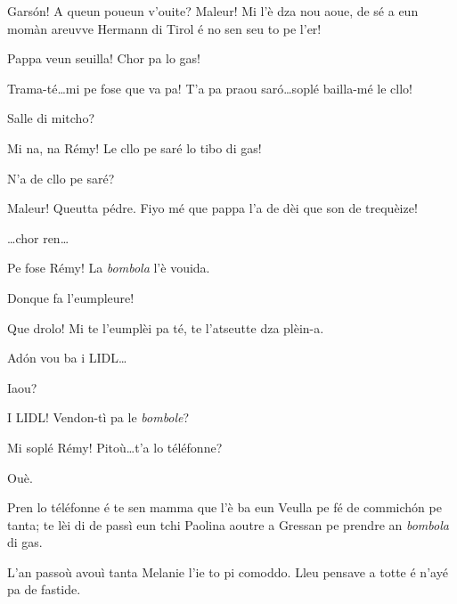 
\begin{drama}

\Cesarspeaks{} Gars\'on! A queun poueun v'ouite? Maleur! Mi l'è dza nou aoue, de sé a eun momàn areuvve Hermann di Tirol é no sen seu to pe l'er!

\Remyspeaks Pappa veun seuilla! Chor pa lo gas! 

\Cesarspeaks{} Trama-té\ldots mi pe fose que va pa! T'a pa praou sar\'o\ldots soplé bailla-mé le cllo!

\Remyspeaks Salle di mitcho?

\Cesarspeaks{} Mi na, na Rémy! Le cllo pe saré lo tibo di gas!

\Remyspeaks N'a de cllo pe saré?

\Cesarspeaks Maleur! Queutta pédre. Fiyo mé que pappa l'a de dèi que son de trequèize!


\Cesarspeaks \ldots chor ren\ldots


\Cesarspeaks  Pe fose Rémy! La \textit{bombola} l’è vouida. 

\Remyspeaks Donque fa l'eumpleure!

\Cesarspeaks{} Que drolo! Mi te l'eumplèi pa té, te l'atseutte dza plèin-a.

\Remyspeaks Ad\'on vou ba i LIDL\ldots

\Cesarspeaks Iaou?

\Remyspeaks I LIDL! Vendon-tì pa le \textit{bombole}?

\Cesarspeaks Mi soplé Rémy! Pitoù\ldots t'a lo téléfonne?

\Remyspeaks Ouè.

\Cesarspeaks Pren lo téléfonne é te sen mamma que l'è ba eun Veulla pe fé de commich\'on pe tanta; te lèi di de passì eun tchi Paolina aoutre a Gressan pe prendre an \textit{bombola} di gas.

\Helenespeaks L’an passoù avouì tanta Melanie l’ie to pi comoddo. Lleu pensave a totte é n'ayé pa de fastide.


\end{drama}
